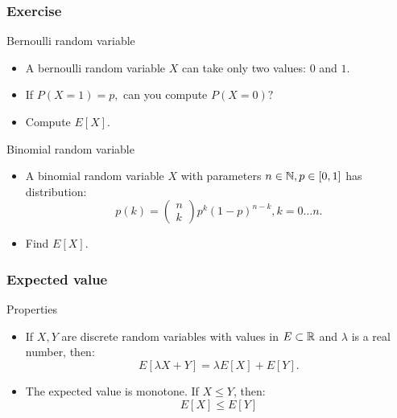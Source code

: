 \begin{frame}
    \frametitle{Exercise}
\begin{block}{Bernoulli random variable}
    \begin{itemize}
        \item<+-> A bernoulli random variable $X$ can take only two values: $0$ and $1$.
        \item<+-> If $P\left( X=1 \right)  = p, $ can you compute $P\left( X=0 \right) ?$
        \item<+-> Compute $E\left[ X \right].$
    \end{itemize}
\end{block}
\begin{block}{Binomial random variable}
    \begin{itemize}
        \item<+-> A binomial random variable $X$ with parameters $n \in \mathbb{N}, p \in [0,1]$ has 
        distribution:
        \begin{equation}
            p(k) = \begin{pmatrix}
                n \\ k
            \end{pmatrix} p^k \left( 1-p \right)^{n-k}, k = 0 \dots n.
        \end{equation}
        \item<+-> Find $E\left[ X \right].$
    \end{itemize}
\end{block}

\end{frame}
\begin{frame}
    \frametitle{Expected value}
\begin{block}{Properties}
    \begin{itemize}
        \item<+-> If $X,Y$ are discrete random variables with values in $E \subset \mathbb{R}$ and 
        $\lambda$ is a real number, then:
        \begin{equation}
            E\left[ \lambda X + Y \right] = \lambda E\left[ X \right] + E \left[ Y \right].
        \end{equation}
        \item<+-> The expected value is monotone. If $X \leq Y$, then:
        \begin{equation}
            E\left[ X \right] \leq E \left[ Y \right]
        \end{equation}
       
    \end{itemize}
\end{block}
\end{frame}
